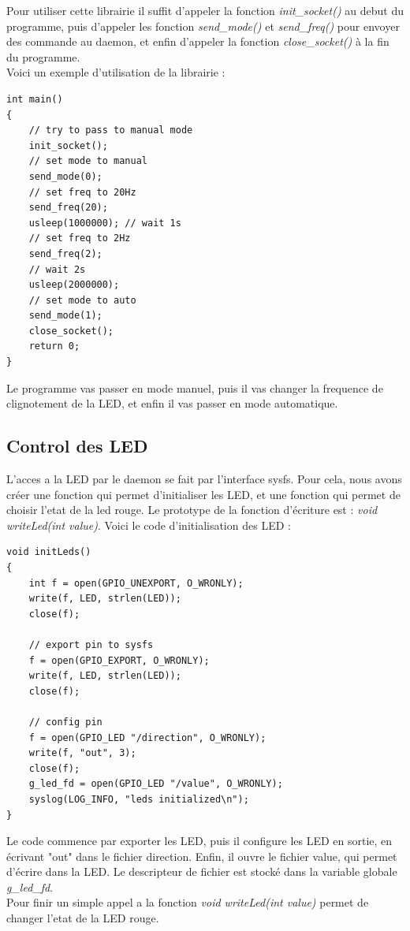\documentclass[
	a4paper, %
	10pt, %
]{CSUniSchoolLabReport}
\begin{document}
Pour utiliser cette librairie il suffit d'appeler la fonction \textit{init\_socket()} au debut du programme, puis d'appeler les fonction \textit{send\_mode()} et \textit{send\_freq()} pour envoyer des commande au daemon, et enfin d'appeler la fonction \textit{close\_socket()} à la fin du programme. \\
Voici un exemple d'utilisation de la librairie : \\
\begin{lstlisting}[style=CStyle]
int main()
{
	// try to pass to manual mode
	init_socket();
	// set mode to manual
	send_mode(0);
	// set freq to 20Hz
	send_freq(20);
	usleep(1000000); // wait 1s
	// set freq to 2Hz
	send_freq(2);
	// wait 2s
	usleep(2000000);
	// set mode to auto
	send_mode(1);
	close_socket();
	return 0;
}
\end{lstlisting}

Le programme vas passer en mode manuel, puis il vas changer la frequence de clignotement de la LED, et enfin il vas passer en mode automatique.


\subsection{Control des LED}\label{Leds}
L'acces a la LED par le daemon se fait par l'interface sysfs.
Pour cela, nous avons créer une fonction qui permet d'initialiser les LED, et une fonction qui permet de choisir l'etat de la led rouge.
Le prototype de la fonction d'écriture est : \textit{void writeLed(int value)}.
Voici le code d'initialisation des LED : \\
\begin{lstlisting}[style=CStyle]
void initLeds()
{
	int f = open(GPIO_UNEXPORT, O_WRONLY);
	write(f, LED, strlen(LED));
	close(f);

	// export pin to sysfs
	f = open(GPIO_EXPORT, O_WRONLY);
	write(f, LED, strlen(LED));
	close(f);

	// config pin
	f = open(GPIO_LED "/direction", O_WRONLY);
	write(f, "out", 3);
	close(f);
	g_led_fd = open(GPIO_LED "/value", O_WRONLY);
	syslog(LOG_INFO, "leds initialized\n");
}
\end{lstlisting}
Le code commence par exporter les LED, puis il configure les LED en sortie, en écrivant "out" dans le fichier direction.
Enfin, il ouvre le fichier value, qui permet d'écrire dans la LED. Le descripteur de fichier est stocké dans la variable globale \textit{g\_led\_fd}. \\
Pour finir un simple appel a la fonction \textit{void writeLed(int value)} permet de changer l'etat de la LED rouge.
\end{document}
